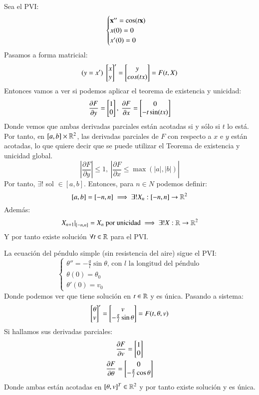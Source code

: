 \begin{eg}[Aplicación del teorema de existencia y unicidad en $\mbf{x}'' = \cos(t\mbf{x})$]
    Sea el PVI:
    $$
        \begin{cases}
            \mathbf{x''} = \cos(t\mathbf{x})\\
            x(0) = 0\\
            x'(0) = 0
        \end{cases}
    $$
    Pasamos a forma matricial:
    $$
        (y = x')\ \mx{x\\y}' = \mx{y\\ cos(tx)} = F(t, X)
    $$
    Entonces vamos a ver si podemos aplicar el teorema de existencia y unicidad:
    $$
        \frac{\partial F}{\partial y} = \mx{1\\0},\ \frac{\partial F}{\partial x} = \mx{0\\ -t\sin(tx)}
    $$
    Donde vemos que ambas derivadas parciales están acotadas si y sólo si $t$ lo está. Por tanto, en $[a, b] \times \mathbb{R}^2$, las derivadas parciales de $F$ con respecto a $x$ e $y$ están acotadas, lo que quiere decir que se puede utilizar el Teorema de existencia y unicidad global.
    $$
        \left| \frac{\partial F}{\partial y} \right| \leq 1,\ \left| \frac{\partial F}{\partial x} \leq \max(|a|, |b|)  \right|
    $$
    Por tanto, $\exists ! $ sol $ \in [a, b]$. Entonces, para $n \in N$ podemos definir:
    $$
        [a, b] = [-n, n] \implies \exists ! X_n: [-n, n] \to \mathbb{R}^2
    $$
    Además:
    $$
        \left. X_{n+1}\right|_{[-n, n]} = X_n \text{ por unicidad} \implies \exists ! X: \mathbb{R} \to \mathbb{R}^2
    $$
    Y por tanto existe solución $\forall t\in \mathbb{R}$ para el PVI.
\end{eg}
\begin{eg}
    La ecuación del péndulo simple (sin resistencia del aire) sigue el PVI:
    $$
        \begin{cases}
            \theta'' = -\frac{g}{l} \sin \theta\text{, con $l$ la longitud del péndulo}\\
            \theta(0) = \theta_0\\
            \theta'(0) = v_0
        \end{cases}
    $$
    Donde podemos ver que tiene solución en $t\in\mathbb{R}$ y es única. Pasando a sistema:
    $$
        \mx{\theta\\v}' = \mx{v\\-\frac{g}{l}\sin\theta} = F(t, \theta, v)
    $$
    Si hallamos sus derivadas parciales:
    \begin{gather*}
        \frac{\partial F}{\partial v} = \mx{1\\0}\\
        \frac{\partial F}{\partial \theta} = \mx{0\\-\frac{g}{l}\cos\theta}
    \end{gather*}
    Donde ambas están acotadas en $[\theta, v]^T\in\mathbb{R}^2$ y por tanto existe solución y es única.
\end{eg}
